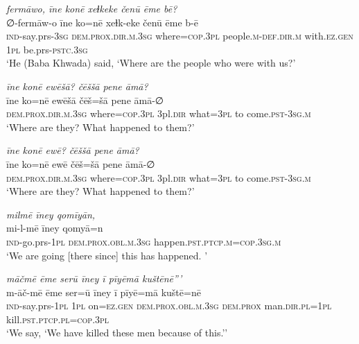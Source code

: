 \ea \label{BP.109}
\textit{fermāwo, īne konē xeɫkeke čenū ēme bē?} \\ 
\gll ∅-fermāw-o īne ko=nē xeɫk-eke čenū ēme b-ē \\ 
 \textsc{ind-}say.prs\textsc{-3sg} \textsc{dem.prox}\textsc{.dir}\textsc{.m}\textsc{.3sg} where\textsc{=cop}\textsc{.3pl} people\textsc{.m}\textsc{-def}\textsc{.dir}\textsc{.m} with\textsc{.ez.gen} \textsc{1pl} be.prs\textsc{-pstc}\textsc{.3sg} \\ 
\glt `He (Baba Khwada) said, ‘Where are the people who were with us?'
\z 
 
\ea \label{BP.111}
\textit{īne konē ewēšā? čēššā pene āmā?} \\ 
\gll īne ko=nē ewēšā čēš=šā pene āmā-∅ \\ 
 \textsc{dem.prox}\textsc{.dir}\textsc{.m}\textsc{.3sg} where\textsc{=cop}\textsc{.3pl} 3pl\textsc{.dir} what\textsc{=3pl} to come\textsc{.pst}\textsc{-3sg}\textsc{.m} \\ 
\glt `Where are they? What happened to them?'
\z 
 
\ea \label{BP.112}
\textit{īne konē ewē? čēššā pene āmā?} \\ 
\gll īne ko=nē ewē čēš=šā pene āmā-∅ \\ 
 \textsc{dem.prox}\textsc{.dir}\textsc{.m}\textsc{.3sg} where\textsc{=cop}\textsc{.3pl} 3pl\textsc{.dir} what\textsc{=3pl} to come\textsc{.pst}\textsc{-3sg}\textsc{.m} \\ 
\glt `Where are they? What happened to them?'
\z 
 
\ea \label{BP.119}
\textit{milmē īney qomīyān,} \\ 
\gll mi-l-mē īney qomyā=n \\ 
 \textsc{ind-}go.prs\textsc{-\textsc{1pl}} \textsc{dem.prox}\textsc{.obl}\textsc{.m}\textsc{.3sg} happen\textsc{.pst}\textsc{.ptcp}\textsc{.m}\textsc{=cop}\textsc{.3sg}\textsc{.m} \\ 
\glt `We are going [there since] this has happened. '
\z 
 
\ea \label{BP.121}
\textit{māčmē ēme serū īney ī pīyēmā kuštēnē”’} \\ 
\gll m-āč-mē ēme ser=ū īney ī pīyē=mā kuštē=nē \\ 
 \textsc{ind-}say.prs\textsc{-\textsc{1pl}} \textsc{1pl} on\textsc{=ez.gen} \textsc{dem.prox}\textsc{.obl}\textsc{.m}\textsc{.3sg} \textsc{dem.prox} man\textsc{.dir}\textsc{.pl}\textsc{=\textsc{1pl}} kill\textsc{.pst}\textsc{.ptcp}\textsc{.pl}\textsc{=cop}\textsc{.3pl} \\ 
\glt `We say, ‘We have killed these men because of this.’'
\z 
 
